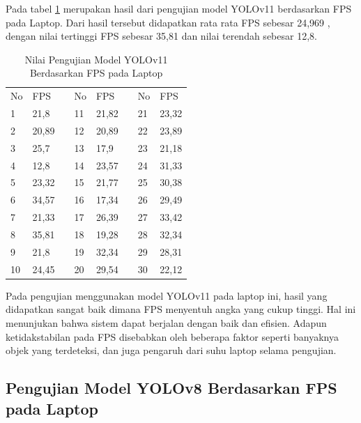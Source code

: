 Pada tabel \ref{tb:TabelYolov11Laptop} merupakan hasil dari pengujian model YOLOv11 berdasarkan FPS pada Laptop. Dari hasil tersebut didapatkan rata rata FPS sebesar 24,969 , dengan nilai tertinggi FPS sebesar 35,81 dan nilai terendah sebesar 12,8.

\begin{table}[H]
  \caption{Nilai Pengujian Model YOLOv11 Berdasarkan FPS pada Laptop} 
  \label{tb:TabelYolov11Laptop}
  \centering
  \begin{tabular}{|l|l|l|l|l|l|l|l|}
  \cline{1-2} \cline{4-5} \cline{7-8}
  No & FPS   &  & No & FPS   &  & No & FPS   \\ \cline{1-2} \cline{4-5} \cline{7-8} 
  1  & 21,8  &  & 11 & 21,82 &  & 21 & 23,32 \\ \cline{1-2} \cline{4-5} \cline{7-8} 
  2  & 20,89 &  & 12 & 20,89 &  & 22 & 23,89 \\ \cline{1-2} \cline{4-5} \cline{7-8} 
  3  & 25,7  &  & 13 & 17,9  &  & 23 & 21,18 \\ \cline{1-2} \cline{4-5} \cline{7-8} 
  4  & 12,8  &  & 14 & 23,57 &  & 24 & 31,33 \\ \cline{1-2} \cline{4-5} \cline{7-8} 
  5  & 23,32 &  & 15 & 21,77 &  & 25 & 30,38 \\ \cline{1-2} \cline{4-5} \cline{7-8} 
  6  & 34,57 &  & 16 & 17,34 &  & 26 & 29,49 \\ \cline{1-2} \cline{4-5} \cline{7-8} 
  7  & 21,33 &  & 17 & 26,39 &  & 27 & 33,42 \\ \cline{1-2} \cline{4-5} \cline{7-8} 
  8  & 35,81 &  & 18 & 19,28 &  & 28 & 32,34 \\ \cline{1-2} \cline{4-5} \cline{7-8} 
  9  & 21,8  &  & 19 & 32,34 &  & 29 & 28,31 \\ \cline{1-2} \cline{4-5} \cline{7-8} 
  10 & 24,45 &  & 20 & 29,54 &  & 30 & 22,12 \\ \cline{1-2} \cline{4-5} \cline{7-8} 
  \end{tabular}
  \end{table}

Pada pengujian menggunakan model YOLOv11 pada laptop ini, hasil yang didapatkan sangat baik dimana FPS menyentuh angka yang cukup tinggi. Hal ini menunjukan bahwa sistem dapat berjalan dengan baik dan efisien. Adapun ketidakstabilan pada FPS disebabkan oleh beberapa faktor seperti banyaknya objek yang terdeteksi, dan juga pengaruh dari suhu laptop selama pengujian. 

\subsection{Pengujian Model YOLOv8 Berdasarkan FPS pada Laptop}

